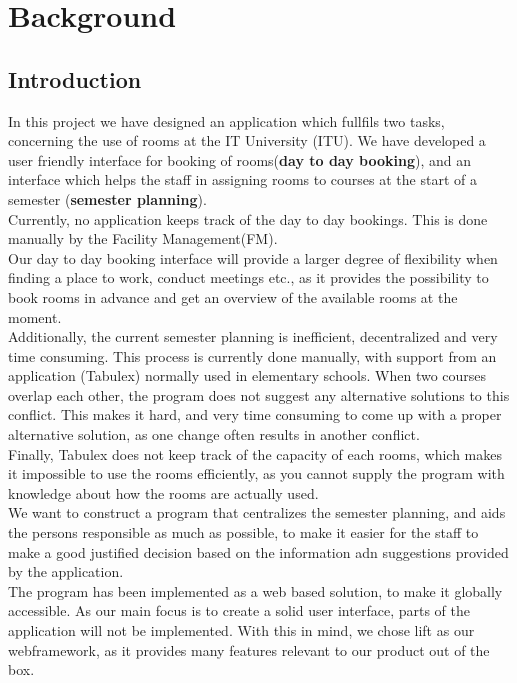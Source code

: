 \chapter{Background}
\section{Introduction}
In this project we have designed an application which fullfils two tasks, concerning the use of rooms at the IT University (ITU). We have developed a user friendly interface for booking of rooms(\textbf{day to day booking}), and an interface which helps the staff in assigning rooms to courses at the start of a semester (\textbf{semester planning}).\\

Currently, no application keeps track of the day to day bookings. This is done manually by the Facility Management(FM).\\
Our day to day booking interface will provide a larger degree of flexibility when finding a place to work, conduct meetings etc., as it provides the possibility to book rooms in advance and get an overview of the available rooms at the moment.\\

 Additionally, the current semester planning is inefficient, decentralized and very time consuming. This process is currently done manually, with support from an application (Tabulex) normally used in elementary schools. When two courses overlap each other, the program does not suggest any alternative solutions to this conflict. This makes it hard, and very time consuming to come up with a proper alternative solution, as one change often results in another conflict.\\
Finally, Tabulex does not keep track of the capacity of each rooms, which makes it impossible to use the rooms efficiently, as you cannot supply the program with knowledge about how the rooms are actually used.\\
We want to construct a program that centralizes the semester planning, and aids the persons responsible as much as possible, to make it easier for the staff to make a good justified decision based on the information adn suggestions provided by the application. \\

The program has been implemented as a web based solution, to make it globally accessible. As our main focus is to create a solid user interface, parts of the application will not be implemented. With this in mind, we chose lift as our webframework, as it provides many features relevant to our product out of the box. 

